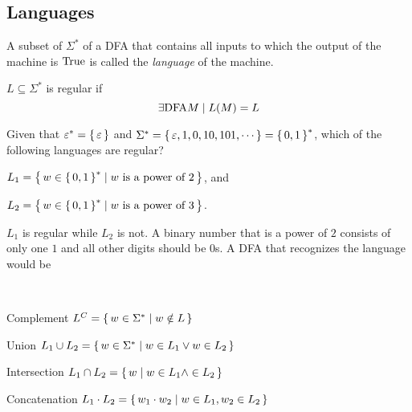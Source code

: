 
\subsection{Languages}

A subset of $\Sigma^*$ of a DFA that contains all inputs to which the output of the
machine is ${ \text{\upshape True} }$ is called the \emph{language} of the machine.

\begin{definition}
    $ L \subseteq \Sigma^* $
    is regular if
    \[
        \exists {\text{\upshape DFA} M} \mid L(M) = L
    \]
\end{definition}

\begin{example}[]
    Given that
    $\varepsilon^* = { \left\{\,\varepsilon\,\right\} }$
    and
    $\Sigma^* = { \left\{\,\varepsilon,1,0,10,101,\cdots\,\right\} } = { \left\{\,0,1\,\right\} }^*$,
    which of the following languages are regular?
    \begin{compactitem}
    \item
        $L_1 = { \left\{\, w \in { \left\{\,0,1\,\right\} }^* \mid w \text{ is a power of } 2\,\right\} }$, and
    \item
        $L_2 = { \left\{\, w \in { \left\{\,0,1\,\right\} }^* \mid w \text{ is a power of } 3\,\right\} }$.
    \end{compactitem}
    
    $L_1$ is regular while $L_2$ is not. A binary number that is a power of $2$ consists
    of only one $1$ and all other digits should be $0$s. A DFA that recognizes the
    language would be

\end{example}

\begin{definition} \ \\
    \begin{compactdesc}
    \item[Complement]
        $L^C = { \left\{\,w \in \Sigma^* \mid w \notin L\,\right\} }$
    \item[Union]
        $L_1 \cup L_2 = { \left\{\,w \in \Sigma^* \mid w \in L_1 \vee w \in L_2\,\right\} }$
    \item[Intersection]
        $L_1 \cap L_2 = { \left\{\,w \mid w \in L_1 \wedge \in L_2\,\right\} }$
    \item[Concatenation]
        $L_1 \cdot L_2 = { \left\{\,w_1 \cdot w_2 \mid w \in L_1, w_2 \in L_2\,\right\} }$
    \end{compactdesc}
\end{definition}

